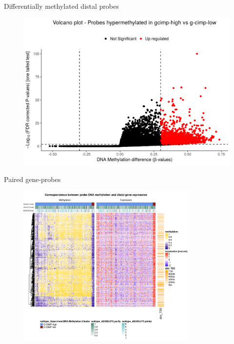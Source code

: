 \documentclass[slidestop,compress,11pt,xcolor=dvipsnames]{beamer}
\begin{document}
\begin{frame}{Differentially methylated distal probes}
\vspace{-0.5cm}
 \begin{figure}[ht!]
  \centering
  \includegraphics[width=1.0\textwidth]{glioma/volcano.png}
  \caption{}
 \end{figure}
\end{frame}

\begin{frame}{Paired gene-probes}
\vspace{-0.5cm}
 \begin{figure}[ht!]
  \centering
  \includegraphics[width=0.8\textwidth]{glioma/heatmap.png}
  \caption{}
 \end{figure}
\end{frame}
\end{document}
